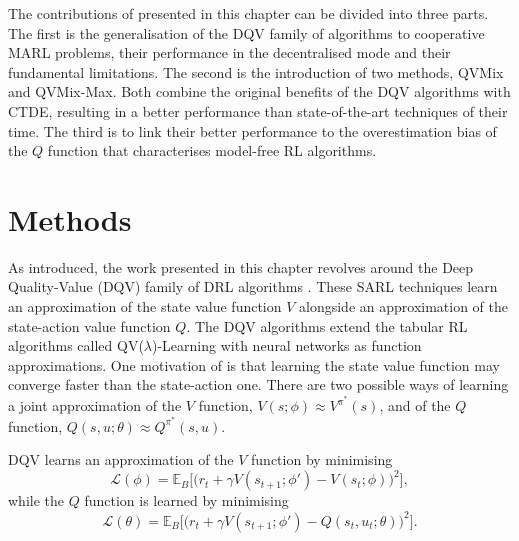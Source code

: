 The contributions of \citep{leroy2020qvmix} presented in this chapter can be divided into three parts.
The first is the generalisation of the DQV family of algorithms to cooperative MARL problems, their performance in the decentralised mode and their fundamental limitations.
The second is the introduction of two methods, QVMix and QVMix-Max.
Both combine the original benefits of the DQV algorithms with CTDE, resulting in a better performance than state-of-the-art techniques of their time.
The third is to link their better performance to the overestimation bias of the $Q$ function that characterises model-free RL algorithms.

\section{Methods} \label{sec:ch4_methods} 

As introduced, the work presented in this chapter revolves around the Deep Quality-Value (DQV) family of DRL algorithms \citep{sabatelli2018deepQV, sabatelli2020deep}.
These SARL techniques learn an approximation of the state value function $V$ alongside an approximation of the state-action value function $Q$.
The DQV algorithms extend the tabular RL algorithms called QV($\lambda$)-Learning \citep{wiering2005qv, wiering2009qv} with neural networks as function approximations.
One motivation of \cite{wiering2005qv} is that learning the state value function may converge faster than the state-action one.
There are two possible ways of learning a joint approximation of the $V$ function, $V(s;\phi)\approx V^{\pi^*}(s)$, and of the $Q$ function, $Q(s, u;\theta)\approx Q^{\pi^*}(s, u)$.

DQV learns an approximation of the $V$ function by minimising
\begin{equation}
    \mathcal{L}(\phi) = \mathbb{E}_{B} \bigg[\big(r_{t} + \gamma V(s_{t+1}; \phi') - V(s_{t}; \phi)\big)^{2}\bigg],
    \label{eq:ch4_dqv_v_update}
\end{equation} 
while the $Q$ function is learned by minimising 
\begin{equation}
    \mathcal{L}(\theta) = \mathbb{E}_{B} \bigg[\big(r_{t} + \gamma V(s_{t+1}; \phi')  - Q(s_{t}, u_{t}; \theta)\big)^{2}\bigg].
\label{eq:ch4_dqv_q_update}
\end{equation}
    
